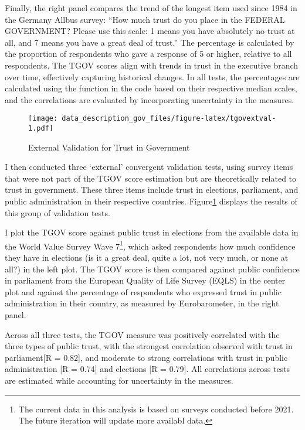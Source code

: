 \documentclass[
  12pt,
]{article}
\begin{document}
Finally, the right panel compares the trend of the longest item used since 1984 in the Germany Allbus survey: ``How much trust do you place in the FEDERAL GOVERNMENT? Please use this scale: 1 means you have absolutely no trust at all, and 7 means you have a great deal of trust.''
The percentage is calculated by the proportion of respondents who gave a response of 5 or higher, relative to all respondents.
The TGOV scores align with trends in trust in the executive branch over time, effectively capturing historical changes.
In all tests, the percentages are calculated using the function in the code based on their respective median scales, and the correlations are evaluated by incorporating uncertainty in the measures.

\begin{figure}
\centering
\texttt{[image: data\_description\_gov\_files/figure-latex/tgovextval-1.pdf]}
\caption{\label{fig:tgovextval}External Validation for Trust in Government \label{tgov_ev1}}
\end{figure}

I then conducted three `external' convergent validation tests, using survey items that were not part of the TGOV score estimation but are theoretically related to trust in government.
These three items include trust in elections, parliament, and public administration in their respective countries.
Figure\nobreakspace{}\ref{tgov_ev1} displays the results of this group of validation tests.

I plot the TGOV score against public trust in elections from the available data in the World Value Survey Wave 7\footnote{The current data in this analysis is based on surveys conducted before 2021. The future iteration will update more availabl data.}, which asked respondents how much confidence they have in elections (is it a great deal, quite a lot, not very much, or none at all?) in the left plot.
The TGOV score is then compared against public confidence in parliament from the European Quality of Life Survey (EQLS) in the center plot and against the percentage of respondents who expressed trust in public administration in their country, as measured by Eurobarometer, in the right panel.

Across all three tests, the TGOV measure was positively correlated with the three types of public trust, with the strongest correlation observed with trust in parliament{[}R = 0.82{]}, and moderate to strong correlations with trust in public administration {[}R = 0.74{]} and elections {[}R = 0.79{]}.
All correlations across tests are estimated while accounting for uncertainty in the measures.
\end{document}
